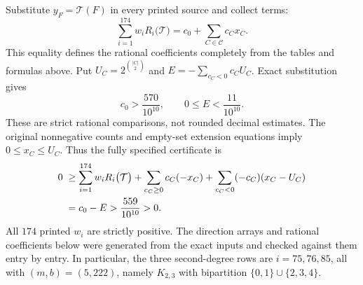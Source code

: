\documentclass[11pt]{article}
\theoremstyle{remark}
\numberwithin{equation}{section}
\begin{document}
Substitute $y_F=\mathcal T(F)$ in every printed source and collect terms:
\begin{equation}
 \sum_{i=1}^{174}w_iR_i\bigl(\mathcal T\bigr)
   =c_0+\sum_{C\in\mathcal C}c_Cx_C.
 \label{eq:405-printed-coefficients}
\end{equation}
This equality defines the rational coefficients completely from the tables
and formulas above. Put $U_C=2^{\binom{|C|}{2}}$ and
$E=-\sum_{c_C<0}c_CU_C$. Exact substitution gives
\begin{equation}
 c_0>\frac{570}{10^{10}},\qquad
 0\le E<\frac{11}{10^{10}}.
 \label{eq:405-printed-rationalbounds}
\end{equation}
These are strict rational comparisons, not rounded decimal estimates.
The original nonnegative counts and empty-set extension equations imply
$0\le x_C\le U_C$. Thus the fully specified certificate is
\begin{align}
 0\;&\ge\sum_{i=1}^{174}w_iR_i\bigl(\mathcal T\bigr)
      +\sum_{c_C\ge0}c_C(-x_C)
      +\sum_{c_C<0}(-c_C)(x_C-U_C)\notag\\
   &=c_0-E>\frac{559}{10^{10}}>0.
 \label{eq:405-printed-contradiction}
\end{align}
All $174$ printed $w_i$ are strictly positive. The direction arrays and
rational coefficients below were generated from the exact inputs and
checked against them entry by entry. In particular, the three
second-degree rows are $i=75,76,85$, all with $(m,b)=(5,222)$,
namely $K_{2,3}$ with bipartition $\{0,1\}\cup\{2,3,4\}$.
\end{document}
